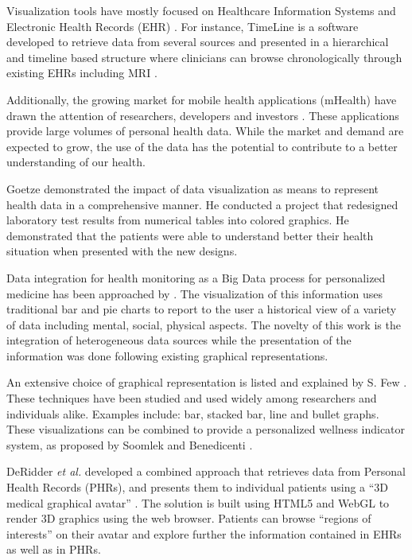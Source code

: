 \documentclass[twocolumn]{bmcart}%
\providecommand{\DIFadd}[1]{{\protect\color{blue}\uwave{#1}}} %
\providecommand{\DIFaddbegin}{} %
\providecommand{\DIFaddend}{} %
\begin{document}

Visualization tools have mostly focused on Healthcare Information Systems and Electronic Health Records (EHR) \cite{lesselroth2011data}. For instance, TimeLine is a software developed to retrieve data from several sources and presented in a hierarchical and timeline based structure where clinicians can browse chronologically through existing EHRs including MRI \cite{bui2007information}.

Additionally, the growing market for mobile health applications (mHealth) have drawn the attention of researchers, developers and investors \cite{mHealth2014}. These applications provide large volumes of personal health data. While the market and demand are expected to grow, the use of the data has the potential to contribute to a better understanding of our health.

Goetze \cite{goetz2015} demonstrated the impact of data visualization as means to represent health data in a comprehensive manner. He conducted a project that redesigned laboratory test results from numerical tables into colored graphics. He demonstrated that the patients were able to understand better their health situation when presented with the new designs.

Data integration for health monitoring as a Big Data process for personalized medicine has been approached by \DIFaddbegin \DIFadd{Idris }\textit{\DIFadd{et al}}\DIFadd{. }\DIFaddend \cite{7072838}. The visualization of this information uses traditional bar and pie charts to report to the user a historical view of a variety of data including mental, social, physical aspects. The novelty of this work is the integration of heterogeneous data sources while the presentation of the information was done following existing graphical representations.

An extensive choice of graphical representation is listed and explained by S. Few \cite{few2006information}. These techniques have been studied and used widely among researchers and individuals alike. Examples include: bar, stacked bar, line and bullet graphs. These visualizations can be combined to provide a personalized wellness indicator system, as proposed by Soomlek and Benedicenti \cite{Soomlek:2013:AWI:2532685.2532686}.

DeRidder \textit{et al.} developed a combined approach that retrieves data from Personal Health Records (PHRs), and presents them to individual patients using a ``3D medical graphical avatar'' \cite{de2013web}. The solution is built using HTML5 and WebGL to render 3D graphics using the web browser. Patients can browse ``regions of interests'' on their avatar and explore further the information contained in EHRs as well as in PHRs.
\end{document}
